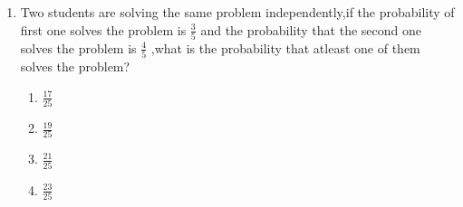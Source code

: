 \renewcommand{\theequation}{\theenumi}
\renewcommand{\thefigure}{\theenumi}
\begin{enumerate}[label=\thesection.\arabic*.,ref=\thesection.\theenumi]

\item Two students are solving the same problem independently,if the probability of first one solves the problem is $\frac{3}{5}$ and the probability that the second one solves the problem is $\frac{4}{5}$ ,what is the probability that atleast one of them solves the problem?
\begin{enumerate}

\item $ \frac{17}{25}$\\
\item $\frac{19}{25}$\\
\item $ \frac{21}{25}$\\
\item $\frac{23}{25}$

\end{enumerate}
%
\solution


% 

\end{enumerate}
